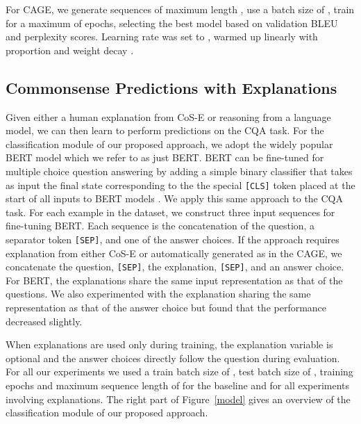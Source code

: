 \documentclass[11pt,a4paper]{article}
\begin{document}
For CAGE, we generate sequences of maximum length , use a batch size of , train for a maximum of  epochs, selecting the best model based on validation BLEU and perplexity scores. Learning rate was set to , warmed up linearly with proportion  and weight decay .


\subsection{Commonsense Predictions with Explanations}
\vspace{-0.2cm}
Given either a human explanation from CoS-E or reasoning from a language model, 
we can then learn to perform predictions on the CQA task.
For the classification module of our proposed approach,
we adopt the widely popular BERT model \citep{devlin2018bert} which we refer to as just BERT.
BERT can be fine-tuned for multiple choice question answering by adding a simple binary classifier that takes as input the final state corresponding to the the special \texttt{[CLS]} token placed at the start of all inputs to BERT models \citep{devlin2018bert}. 
We apply this same approach to the CQA task. 
For each example in the dataset, we construct three input sequences for fine-tuning BERT.
Each sequence is the concatenation of the question, a separator token \texttt{[SEP]}, and one of the answer choices.
If the approach requires explanation from either CoS-E or automatically generated as in the CAGE,
we concatenate the question, \texttt{[SEP]}, the explanation, \texttt{[SEP]}, and an answer choice. For BERT, the explanations share the same input representation as that of the questions. We also experimented with the explanation sharing the same representation as that of the answer choice but found that the performance decreased slightly.

When explanations are used only during training, 
the explanation variable is optional and the answer choices directly follow the question during evaluation.
For all our experiments we used a train batch size of , test batch size of ,  training epochs and maximum sequence length of  for the baseline and  for all experiments involving explanations.
The right part of Figure~\ref{model} gives an overview of the classification module of our proposed approach.

\begin{comment}
  \begin{figure}
 \centering
 \texttt{[image: figures/b.png]}
\caption{Random sample of explanations generated by our LM.} \label{expl-gen}
 \end{figure}
\end{comment}
\end{document}
